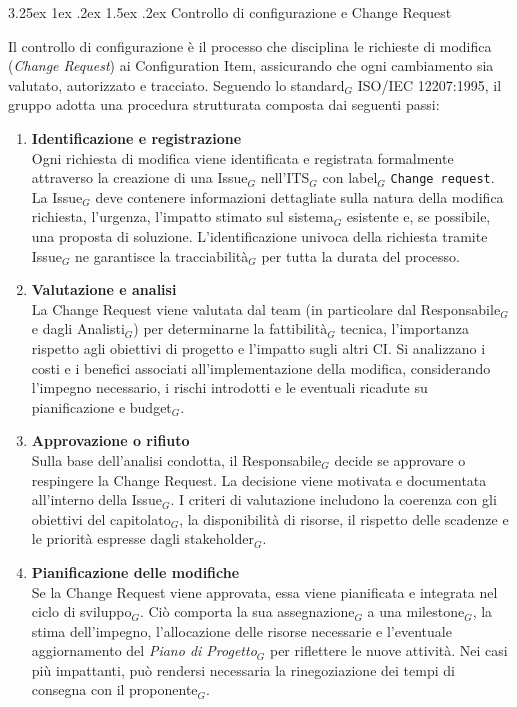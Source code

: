 \documentclass[a4paper, 10pt]{article}
\makeatletter
\renewcommand\paragraph{\@startsection{paragraph}{4}{\z@}%
  {3.25ex \@plus1ex \@minus .2ex}%
  {1.5ex \@plus .2ex}%
  {\normalfont\normalsize\bfseries}}
\makeatother
\begin{document}
\paragraph{Controllo di configurazione e Change Request}

Il controllo di configurazione è il processo che disciplina le richieste di modifica (\emph{Change Request}) ai Configuration Item, assicurando che ogni cambiamento sia valutato, autorizzato e tracciato. Seguendo lo standard$_G$ ISO/IEC 12207:1995, il gruppo adotta una procedura strutturata composta dai seguenti passi:

\begin{enumerate}
    \item \textbf{Identificazione e registrazione}\\
    Ogni richiesta di modifica viene identificata e registrata formalmente attraverso la creazione di una Issue$_G$ nell'ITS$_G$ con label$_G$ \texttt{Change request}. La Issue$_G$ deve contenere informazioni dettagliate sulla natura della modifica richiesta, l'urgenza, l'impatto stimato sul sistema$_G$ esistente e, se possibile, una proposta di soluzione. L'identificazione univoca della richiesta tramite Issue$_G$ ne garantisce la tracciabilità$_G$ per tutta la durata del processo.
    
    \item \textbf{Valutazione e analisi}\\
    La Change Request viene valutata dal team (in particolare dal Responsabile$_G$ e dagli Analisti$_G$) per determinarne la fattibilità$_G$ tecnica, l'importanza rispetto agli obiettivi di progetto e l'impatto sugli altri CI. Si analizzano i costi e i benefici associati all'implementazione della modifica, considerando l'impegno necessario, i rischi introdotti e le eventuali ricadute su pianificazione e budget$_G$.
    
    \item \textbf{Approvazione o rifiuto}\\
    Sulla base dell'analisi condotta, il Responsabile$_G$ decide se approvare o respingere la Change Request. La decisione viene motivata e documentata all'interno della Issue$_G$. I criteri di valutazione includono la coerenza con gli obiettivi del capitolato$_G$, la disponibilità di risorse, il rispetto delle scadenze e le priorità espresse dagli stakeholder$_G$.
    
    \item \textbf{Pianificazione delle modifiche}\\
    Se la Change Request viene approvata, essa viene pianificata e integrata nel ciclo di sviluppo$_G$. Ciò comporta la sua assegnazione$_G$ a una milestone$_G$, la stima dell'impegno, l'allocazione delle risorse necessarie e l'eventuale aggiornamento del \emph{Piano di Progetto}$_G$ per riflettere le nuove attività. Nei casi più impattanti, può rendersi necessaria la rinegoziazione dei tempi di consegna con il proponente$_G$.
    

\end{enumerate}
\end{document}
